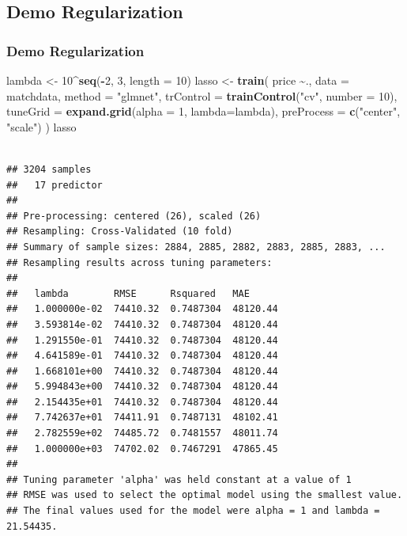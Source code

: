 \documentclass[
  shownotes,
  xcolor={svgnames},
  hyperref={colorlinks,citecolor=DarkBlue,linkcolor=DarkRed,urlcolor=DarkBlue}
  ]{beamer}
\newenvironment{Shaded}{\begin{snugshade}}{\end{snugshade}}
\newcommand{\DataTypeTok}[1]{\textcolor[rgb]{0.13,0.29,0.53}{#1}}
\newcommand{\DecValTok}[1]{\textcolor[rgb]{0.00,0.00,0.81}{#1}}
\newcommand{\KeywordTok}[1]{\textcolor[rgb]{0.13,0.29,0.53}{\textbf{#1}}}
\newcommand{\NormalTok}[1]{#1}
\newcommand{\OperatorTok}[1]{\textcolor[rgb]{0.81,0.36,0.00}{\textbf{#1}}}
\newcommand{\StringTok}[1]{\textcolor[rgb]{0.31,0.60,0.02}{#1}}
\begin{document}
\subsection{Demo Regularization}
\begin{frame}[fragile]
\frametitle{Demo Regularization}

\begin{tiny}


\begin{Shaded}
\begin{Highlighting}[]
\NormalTok{lambda \textless{}{-}}\StringTok{ }\DecValTok{10}\OperatorTok{\^{}}\KeywordTok{seq}\NormalTok{(}\OperatorTok{{-}}\DecValTok{2}\NormalTok{, }\DecValTok{3}\NormalTok{, }\DataTypeTok{length =} \DecValTok{10}\NormalTok{)}
\NormalTok{lasso \textless{}{-}}\StringTok{ }\KeywordTok{train}\NormalTok{(}
\NormalTok{  price }\OperatorTok{\textasciitilde{}}\NormalTok{., }\DataTypeTok{data =}\NormalTok{ matchdata, }\DataTypeTok{method =} \StringTok{"glmnet"}\NormalTok{,}
  \DataTypeTok{trControl =} \KeywordTok{trainControl}\NormalTok{(}\StringTok{"cv"}\NormalTok{, }\DataTypeTok{number =} \DecValTok{10}\NormalTok{),}
  \DataTypeTok{tuneGrid =} \KeywordTok{expand.grid}\NormalTok{(}\DataTypeTok{alpha =} \DecValTok{1}\NormalTok{, }
  \DataTypeTok{lambda=}\NormalTok{lambda), }\DataTypeTok{preProcess =} \KeywordTok{c}\NormalTok{(}\StringTok{"center"}\NormalTok{, }\StringTok{"scale"}\NormalTok{)}
\NormalTok{  )}
\NormalTok{lasso}
\end{Highlighting}
\end{Shaded}
\end{tiny}
\begin{tiny}

\begin{verbatim}

## 3204 samples
##   17 predictor
## 
## Pre-processing: centered (26), scaled (26) 
## Resampling: Cross-Validated (10 fold) 
## Summary of sample sizes: 2884, 2885, 2882, 2883, 2885, 2883, ... 
## Resampling results across tuning parameters:
## 
##   lambda        RMSE      Rsquared   MAE     
##   1.000000e-02  74410.32  0.7487304  48120.44
##   3.593814e-02  74410.32  0.7487304  48120.44
##   1.291550e-01  74410.32  0.7487304  48120.44
##   4.641589e-01  74410.32  0.7487304  48120.44
##   1.668101e+00  74410.32  0.7487304  48120.44
##   5.994843e+00  74410.32  0.7487304  48120.44
##   2.154435e+01  74410.32  0.7487304  48120.44
##   7.742637e+01  74411.91  0.7487131  48102.41
##   2.782559e+02  74485.72  0.7481557  48011.74
##   1.000000e+03  74702.02  0.7467291  47865.45
## 
## Tuning parameter 'alpha' was held constant at a value of 1
## RMSE was used to select the optimal model using the smallest value.
## The final values used for the model were alpha = 1 and lambda = 21.54435.
\end{verbatim}
\end{tiny}
\end{frame}
\end{document}

